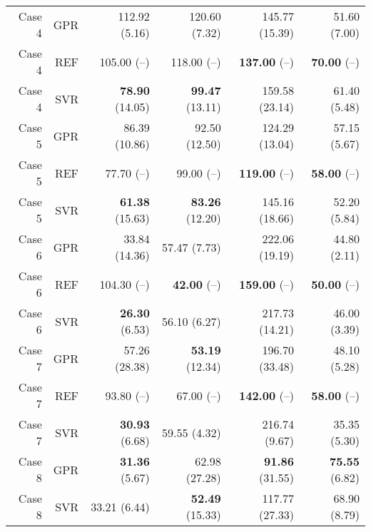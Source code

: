 \begin{table}
\begin{tabular}{rrrrrr}
 Case 4 &       GPR &         112.92 (5.16) &          120.60 (7.32) &         145.77 (15.39) &         51.60 (7.00) \\
 Case 4 &       REF &           105.00 (--) &            118.00 (--) &     { \bf 137.00} (--) &    { \bf 70.00} (--) \\
 Case 4 &       SVR &  { \bf 78.90} (14.05) &   { \bf 99.47} (13.11) &         159.58 (23.14) &         61.40 (5.48) \\
 Case 5 &       GPR &         86.39 (10.86) &          92.50 (12.50) &         124.29 (13.04) &         57.15 (5.67) \\
 Case 5 &       REF &            77.70 (--) &             99.00 (--) &     { \bf 119.00} (--) &    { \bf 58.00} (--) \\
 Case 5 &       SVR &  { \bf 61.38} (15.63) &   { \bf 83.26} (12.20) &         145.16 (18.66) &         52.20 (5.84) \\
 Case 6 &       GPR &         33.84 (14.36) &           57.47 (7.73) &         222.06 (19.19) &         44.80 (2.11) \\
 Case 6 &       REF &           104.30 (--) &      { \bf 42.00} (--) &     { \bf 159.00} (--) &    { \bf 50.00} (--) \\
 Case 6 &       SVR &   { \bf 26.30} (6.53) &           56.10 (6.27) &         217.73 (14.21) &         46.00 (3.39) \\
 Case 7 &       GPR &         57.26 (28.38) &   { \bf 53.19} (12.34) &         196.70 (33.48) &         48.10 (5.28) \\
 Case 7 &       REF &            93.80 (--) &             67.00 (--) &     { \bf 142.00} (--) &    { \bf 58.00} (--) \\
 Case 7 &       SVR &   { \bf 30.93} (6.68) &           59.55 (4.32) &          216.74 (9.67) &         35.35 (5.30) \\
 Case 8 &       GPR &   { \bf 31.36} (5.67) &          62.98 (27.28) &   { \bf 91.86} (31.55) &  { \bf 75.55} (6.82) \\
 Case 8 &       SVR &          33.21 (6.44) &   { \bf 52.49} (15.33) &         117.77 (27.33) &         68.90 (8.79) \\
\bottomrule
\end{tabular}
\end{table}
